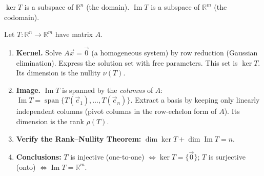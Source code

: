 \documentclass[11pt]{article}
\newcommand{\cle}[1]{{\popxbold\color{popdark}#1}}
\begin{document}
\begin{propriete}
$\ker T$ is a subspace of $\mathbb{R}^n$ (the domain). $\operatorname{Im} T$ is a subspace of $\mathbb{R}^m$ (the codomain).
\end{propriete}

\begin{methode}
Let $T:\mathbb{R}^n\to\mathbb{R}^m$ have matrix $A$.
\begin{enumerate}
\item \textbf{Kernel.} Solve $A\vec{x}=\vec{0}$ (a homogeneous system) by row reduction (Gaussian elimination). Express the solution set with free parameters. This set is $\ker T$. Its dimension is the \cle{nullity} $\nu(T)$.
\item \textbf{Image.} $\operatorname{Im} T$ is spanned by the \emph{columns} of $A$: $\operatorname{Im} T=\operatorname{span}\{T(\vec{e}_1),\dots,T(\vec{e}_n)\}$. Extract a basis by keeping only linearly independent columns (pivot columns in the row-echelon form of $A$). Its dimension is the \cle{rank} $\rho(T)$.
\item \textbf{Verify the Rank--Nullity Theorem:} $\dim\ker T+\dim\operatorname{Im} T=n$.
\item \textbf{Conclusions:} $T$ is injective (one-to-one) $\iff \ker T=\{\vec{0}\}$; $T$ is surjective (onto) $\iff \operatorname{Im} T=\mathbb{R}^m$.
\end{enumerate}
\end{methode}
\end{document}
